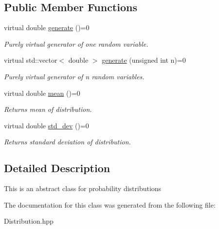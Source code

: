 \subsection*{Public Member Functions}
\begin{DoxyCompactItemize}
\item 
\mbox{\label{classDistribution_a91458823c935b60e12ffdb30611a19d0}} 
virtual double \hyperlink{classDistribution_a91458823c935b60e12ffdb30611a19d0}{generate} ()=0
\begin{DoxyCompactList}\small\item\em Purely virtual generator of one random variable. \end{DoxyCompactList}\item 
\mbox{\label{classDistribution_a36008493d92ffa817eb4a081f39cb245}} 
virtual std\+::vector$<$ double $>$ \hyperlink{classDistribution_a36008493d92ffa817eb4a081f39cb245}{generate} (unsigned int n)=0
\begin{DoxyCompactList}\small\item\em Purely virtual generator of n random variables. \end{DoxyCompactList}\item 
\mbox{\label{classDistribution_a3b3276fce6065d76c560b4f2082ecd2e}} 
virtual double \hyperlink{classDistribution_a3b3276fce6065d76c560b4f2082ecd2e}{mean} ()=0
\begin{DoxyCompactList}\small\item\em Returns mean of distribution. \end{DoxyCompactList}\item 
\mbox{\label{classDistribution_ae802ff31ce4087e06ea26269b60ffebd}} 
virtual double \hyperlink{classDistribution_ae802ff31ce4087e06ea26269b60ffebd}{std\+\_\+dev} ()=0
\begin{DoxyCompactList}\small\item\em Returns standard deviation of distribution. \end{DoxyCompactList}\end{DoxyCompactItemize}


\subsection{Detailed Description}
This is an abstract class for probability distributions 

The documentation for this class was generated from the following file\+:\begin{DoxyCompactItemize}
\item 
Distribution.\+hpp\end{DoxyCompactItemize}
